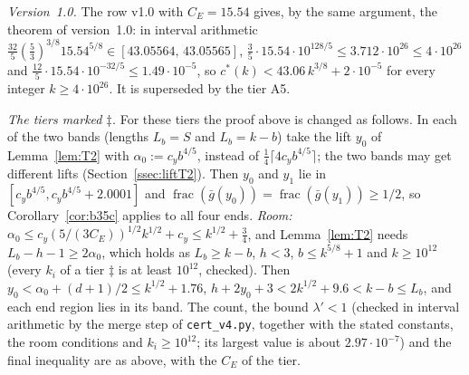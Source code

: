\documentclass[11pt]{amsart}
\newcommand{\cs}{c^{*}}
\theoremstyle{definition}
\theoremstyle{remark}
\numberwithin{equation}{section}
\begin{document}
\emph{Version~1.0.} The row v1.0 with $C_E=15.54$ gives, by the same argument, the theorem of version~1.0: in interval
arithmetic $\frac{32}5(\frac53)^{3/8}15.54^{5/8}\in[43.05564,\,43.05565]$, $\frac35\cdot15.54\cdot10^{128/5}\le
3.712\cdot10^{26}\le4\cdot10^{26}$ and $\frac{12}5\cdot15.54\cdot10^{-32/5}\le1.49\cdot10^{-5}$, so
$\cs(k)<43.06\,k^{3/8}+2\cdot10^{-5}$ for every integer $k\ge4\cdot10^{26}$. It is superseded by the tier A5.

\emph{The tiers marked $\ddagger$.} For these tiers the proof above is changed as follows. In each of the two bands
(lengths $L_b=S$ and $L_b=k-b$) take the lift $y_0$ of Lemma~\ref{lem:T2} with $\alpha_0:=c_yb^{4/5}$, instead of
$\frac14\lceil4c_yb^{4/5}\rceil$; the two bands may get different lifts (Section~\ref{ssec:liftT2}). Then $y_0$ and $y_1$
lie in $[c_yb^{4/5},c_yb^{4/5}+2.0001]$ and $\operatorname{frac}(\bar g(y_0))=\operatorname{frac}(\bar g(y_1))\ge1/2$,
so Corollary~\ref{cor:b35c} applies to all four ends. \emph{Room:} $\alpha_0\le c_y(5/(3C_E))^{1/2}k^{1/2}+c_y\le k^{1/2}+\frac34$,
and Lemma~\ref{lem:T2} needs $L_b-h-1\ge2\alpha_0$, which holds as $L_b\ge k-b$, $h<3$, $b\le k^{5/8}+1$ and $k\ge10^{12}$
(every $k_i$ of a tier $\ddagger$ is at least $10^{12}$, checked). Then $y_0<\alpha_0+(d+1)/2\le k^{1/2}+1.76$,
$h+2y_0+3<2k^{1/2}+9.6<k-b\le L_b$, and each end region lies in its band. The count, the bound $\lambda'<1$ (checked in
interval arithmetic by the merge step of \texttt{cert\_v4.py}, together with the stated constants, the room conditions and
$k_i\ge10^{12}$; its largest value is about $2.97\cdot10^{-7}$) and the final inequality are as above, with the $C_E$
of the tier.
\end{document}
